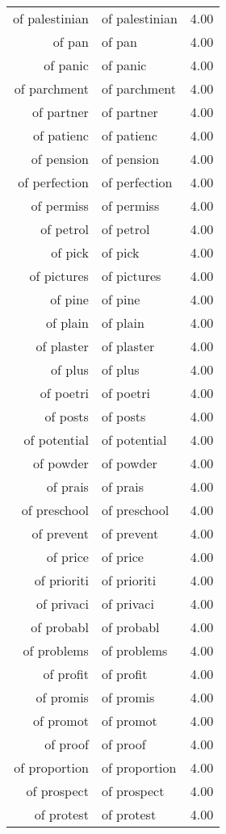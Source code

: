 \begin{table}[ht]
\begin{tabular}{rlr}
  of palestinian & of palestinian & 4.00 \\ 
  of pan & of pan & 4.00 \\ 
  of panic & of panic & 4.00 \\ 
  of parchment & of parchment & 4.00 \\ 
  of partner & of partner & 4.00 \\ 
  of patienc & of patienc & 4.00 \\ 
  of pension & of pension & 4.00 \\ 
  of perfection & of perfection & 4.00 \\ 
  of permiss & of permiss & 4.00 \\ 
  of petrol & of petrol & 4.00 \\ 
  of pick & of pick & 4.00 \\ 
  of pictures & of pictures & 4.00 \\ 
  of pine & of pine & 4.00 \\ 
  of plain & of plain & 4.00 \\ 
  of plaster & of plaster & 4.00 \\ 
  of plus & of plus & 4.00 \\ 
  of poetri & of poetri & 4.00 \\ 
  of posts & of posts & 4.00 \\ 
  of potential & of potential & 4.00 \\ 
  of powder & of powder & 4.00 \\ 
  of prais & of prais & 4.00 \\ 
  of preschool & of preschool & 4.00 \\ 
  of prevent & of prevent & 4.00 \\ 
  of price & of price & 4.00 \\ 
  of prioriti & of prioriti & 4.00 \\ 
  of privaci & of privaci & 4.00 \\ 
  of probabl & of probabl & 4.00 \\ 
  of problems & of problems & 4.00 \\ 
  of profit & of profit & 4.00 \\ 
  of promis & of promis & 4.00 \\ 
  of promot & of promot & 4.00 \\ 
  of proof & of proof & 4.00 \\ 
  of proportion & of proportion & 4.00 \\ 
  of prospect & of prospect & 4.00 \\ 
  of protest & of protest & 4.00 \\ 

\end{tabular}
\end{table}
